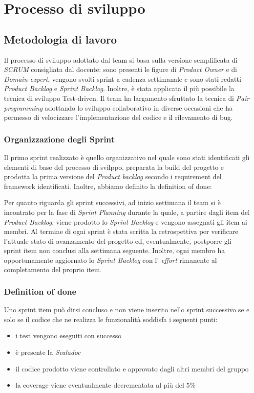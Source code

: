 \chapter{Processo di sviluppo}\label{ch:processo-di-sviluppo}
\section{Metodologia di lavoro}\label{sec:metodologia-di-lavoro}
Il processo di sviluppo adottato dal team si basa sulla versione semplificata di \textit{SCRUM} consigliata dal docente:
sono presenti le figure di \textit{Product Owner} e di \textit{Domain expert}, vengono svolti sprint a cadenza settimanale e sono stati redatti
\textit{Product Backlog} e \textit{Sprint Backlog}.
Inoltre, è stata applicata il più possibile la tecnica di sviluppo Test-driven.
Il team ha largamento sfruttato la tecnica di \textit{Pair programming} adottando lo sviluppo collaborativo in diverse occasioni che ha permesso di velocizzare
l'implementazione del codice e il rilevamento di bug.

\subsection{Organizzazione degli Sprint}\label{subsec:organizzazione-sprint}
Il primo sprint realizzato è quello organizzativo nel quale sono stati identificati gli elementi di base del processo di svilppo, preparata la build del progetto e prodotta la prima versione del \textit{Product backlog}
secondo i requirement del framework identificati.
Inoltre, abbiamo definito la definition of done:


Per quanto riguarda gli sprint successivi, ad inizio settimana il team si è incontrato per la fase di \textit{Sprint Planning} durante la quale, a partire dagli item del \textit{Product Backlog}, viene prodotto
lo \textit{Sprint Backlog} e vengono assegnati gli item ai membri.
Al termine di ogni sprint è stata scritta la retrospettiva per verificare l'attuale stato di avanzamento del progetto ed, eventualmente,
postporre gli sprint item non conclusi alla settimana seguente.
Inoltre, ogni membro ha opportunamente aggiornato lo \textit{Sprint Backlog} con l' \textit{effort} rimanente al completamento del proprio item.

\subsection{Definition of done}\label{subsec:definition-of-done}
Uno sprint item può dirsi concluso e non viene inserito nello sprint successivo se e solo se il codice che ne realizza le funzionalità soddisfa i seguenti punti:
\begin{itemize}
    \item i test vengono eseguiti con successo
    \item è presente la \textit{Scaladoc}
    \item il codice prodotto viene controllato e approvato dagli altri membri del gruppo
    \item la coverage viene eventualmente decrementata al più del 5\%
\end{itemize}

